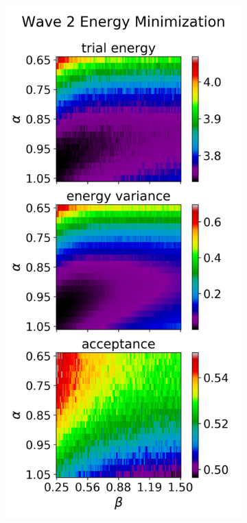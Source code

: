 \documentclass[nofootinbib,reprint,english]{revtex4-1}
\begin{document}
\onecolumngrid
\clearpage
~
\hspace*{8cm}
\begin{figure}[h!]
\centering
	\begin{subfigure}[b]{0.48\textwidth}
	\centering
	\includegraphics[scale=0.7]{../results/wave2/energy_minimization_1.png}

\end{subfigure}
\end{figure}
\end{document}
